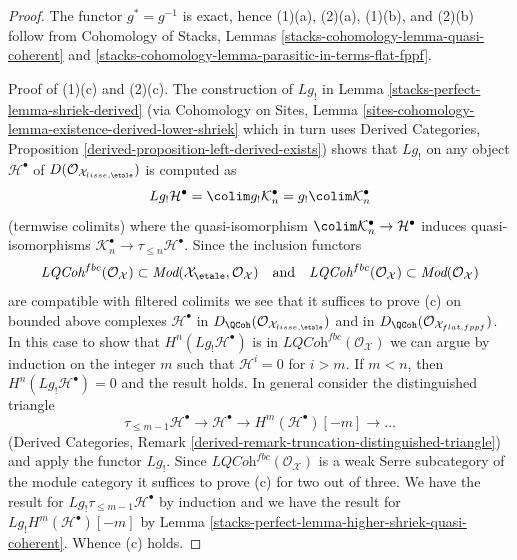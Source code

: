 \begin{proof}
The functor $g^* = g^{-1}$ is exact, hence (1)(a), (2)(a), (1)(b), and (2)(b)
follow from Cohomology of Stacks,
Lemmas \ref{stacks-cohomology-lemma-quasi-coherent} and
\ref{stacks-cohomology-lemma-parasitic-in-terms-flat-fppf}.

\medskip\noindent
Proof of (1)(c) and (2)(c).
The construction of $Lg_!$ in Lemma \ref{stacks-perfect-lemma-shriek-derived}
(via Cohomology on Sites,
Lemma \ref{sites-cohomology-lemma-existence-derived-lower-shriek}
which in turn uses
Derived Categories, Proposition \ref{derived-proposition-left-derived-exists})
shows that $Lg_!$ on any object $\mathcal{H}^\bullet$ of
$D(\mathcal{O}_{\mathcal{X}_{lisse,\etale}})$ is computed
as
$$
Lg_!\mathcal{H}^\bullet = \colim g_!\mathcal{K}_n^\bullet =
g_! \colim \mathcal{K}_n^\bullet
$$
(termwise colimits) where the quasi-isomorphism
$\colim \mathcal{K}_n^\bullet \to \mathcal{H}^\bullet$
induces quasi-isomorphisms
$\mathcal{K}_n^\bullet \to \tau_{\leq n} \mathcal{H}^\bullet$.
Since the inclusion functors
$$
\textit{LQCoh}^{fbc}(\mathcal{O}_\mathcal{X}) \subset
\textit{Mod}(\mathcal{X}_\etale, \mathcal{O}_\mathcal{X})
\quad\text{and}\quad
\textit{LQCoh}^{fbc}(\mathcal{O}_\mathcal{X}) \subset
\textit{Mod}(\mathcal{O}_\mathcal{X})
$$
are compatible with filtered colimits we see that it suffices to prove (c)
on bounded above complexes $\mathcal{H}^\bullet$ in
$D_\QCoh(\mathcal{O}_{\mathcal{X}_{lisse,\etale}})$ and in
$D_\QCoh(\mathcal{O}_{\mathcal{X}_{flat,fppf}})$.
In this case to show that $H^n(Lg_!\mathcal{H}^\bullet)$ is
in $\textit{LQCoh}^{fbc}(\mathcal{O}_\mathcal{X})$
we can argue by induction on the integer
$m$ such that $\mathcal{H}^i = 0$ for $i > m$. If $m < n$, then
$H^n(Lg_!\mathcal{H}^\bullet) = 0$ and the result holds. In general
consider the distinguished triangle
$$
\tau_{\leq m - 1}\mathcal{H}^\bullet \to \mathcal{H}^\bullet \to
H^m(\mathcal{H}^\bullet)[-m] \to \ldots
$$
(Derived Categories, Remark
\ref{derived-remark-truncation-distinguished-triangle})
and apply the functor $Lg_!$. Since
$\textit{LQCoh}^{fbc}(\mathcal{O}_\mathcal{X})$
is a weak Serre subcategory of the module category it suffices to
prove (c) for two out of three. We have the result for
$Lg_!\tau_{\leq m - 1}\mathcal{H}^\bullet$ by induction and we
have the result for $Lg_!H^m(\mathcal{H}^\bullet)[-m]$ by
Lemma \ref{stacks-perfect-lemma-higher-shriek-quasi-coherent}. Whence (c) holds.


\end{proof}
